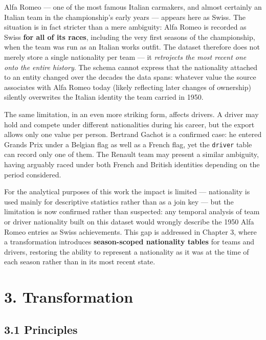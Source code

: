 \documentclass[
]{article}
\begin{document}
Alfa Romeo --- one of the most famous Italian carmakers, and almost
certainly an Italian team in the championship's early years --- appears
here as Swiss. The situation is in fact stricter than a mere ambiguity:
Alfa Romeo is recorded as Swiss \textbf{for all of its races}, including
the very first seasons of the championship, when the team was run as an
Italian works outfit. The dataset therefore does not merely store a
single nationality per team --- it \emph{retrojects the most recent one
onto the entire history}. The schema cannot express that the nationality
attached to an entity changed over the decades the data spans: whatever
value the source associates with Alfa Romeo today (likely reflecting
later changes of ownership) silently overwrites the Italian identity the
team carried in 1950.

The same limitation, in an even more striking form, affects drivers. A
driver may hold and compete under different nationalities during his
career, but the export allows only one value per person. Bertrand Gachot
is a confirmed case: he entered Grands Prix under a Belgian flag as well
as a French flag, yet the \texttt{driver} table can record only one of
them. The Renault team may present a similar ambiguity, having arguably
raced under both French and British identities depending on the period
considered.

For the analytical purposes of this work the impact is limited ---
nationality is used mainly for descriptive statistics rather than as a
join key --- but the limitation is now confirmed rather than suspected:
any temporal analysis of team or driver nationality built on this
dataset would wrongly describe the 1950 Alfa Romeo entries as Swiss
achievements. This gap is addressed in Chapter 3, where a transformation
introduces \textbf{season-scoped nationality tables} for teams and
drivers, restoring the ability to represent a nationality as it was at
the time of each season rather than in its most recent state.

\newpage

\section{3. Transformation}\label{transformation}

\subsection{3.1 Principles}\label{principles}
\end{document}
